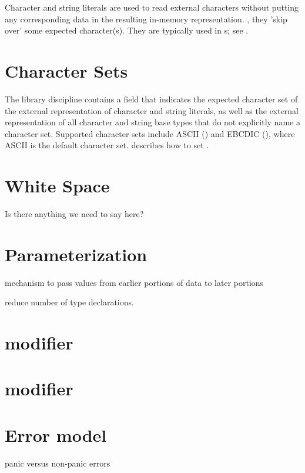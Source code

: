 Character and string literals are used to read external characters
without putting any corresponding data in the resulting in-memory representation.
\Ie, they 'skip over' some expected character(s).
They are typically used in \Pstruct{}s; see .

\section{Character Sets}
\label{sec:common-character-sets}

The library discipline contains a field  that
indicates the expected character set of the external representation of
character and string literals, as well as the external representation of all character and string
base types that do not explicitly name a character set.  Supported
character sets include ASCII () and EBCDIC
(), where ASCII is the default character set.
 describes how
to set .

\section{White Space}
\label{sec:common-features-white-space}
Is there anything we need to say here?

\section{Parameterization}
\label{sec:common-parameterization}
 mechanism to pass values from earlier portions of data to later
 portions
 
 reduce number of type declarations.


\section{\Precord{} modifier}

\section{\Pfile{} modifier}

\section{Error model}
\label{sec:common-error-model}
 panic versus non-panic errors

